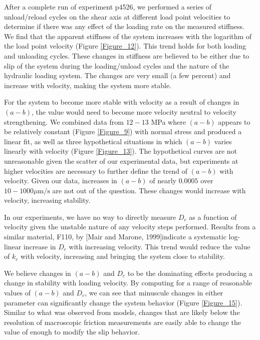 After a complete run of experiment p4526, we performed a series of unload/reload cycles on the shear axis at different load point velocities to determine if there was any effect of the loading rate on the measured stiffness. We find that the apparent stiffness of the system increases with the logarithm of the load point velocity (Figure \ref{Figure_12}). This trend holds for both loading and unloading cycles. These changes in stiffness are believed to be either due to slip of the system during the loading/unload cycles and the nature of the hydraulic loading system. The changes are very small (a few percent) and increase  with velocity, making the system more stable.

For the system to become more stable with velocity as a result of changes in $(a-b)$, the value would need to become more velocity neutral to velocity strengthening. We combined data from $12-13$ MPa where $(a-b)$ appears to be relatively constant (Figure \ref{Figure_9}) with normal stress and produced a linear fit, as well as three hypothetical situations in which $(a-b)$ varies linearly with velocity (Figure \ref{Figure_13}). The hypothetical curves are not unreasonable given the scatter of our experimental data, but experiments at higher velocities are necessary to further define the trend of $(a-b)$ with velocity. Given our data, increases in $(a-b)$ of nearly $0.0005$ over $10-1000 \mu\text{m/s}$ are not out of the question. These changes would increase  with velocity, increasing stability.

In our experiments, we have no way to directly measure $D_c$ as a function of velocity given the unstable nature of any velocity steps performed. Results from a similar material, F110, by \cite{}[Mair and Marone, 1999]indicate a systematic log-linear increase in $D_c$ with increasing velocity. This trend would reduce the value of $k_c$ with velocity, increasing  and bringing the system close to stability.

We believe changes in $(a-b)$ and $D_c$ to be the dominating effects producing a change in stability with loading velocity. By computing  for a range of reasonable values of $(a-b)$ and $D_c$, we can see that minuscule changes in either parameter can significantly change the system behavior (Figure \ref{Figure_15}). Similar to what was observed from models, changes that are likely below the resolution of macroscopic friction measurements are easily able to change the value of  enough to modify the slip behavior.

